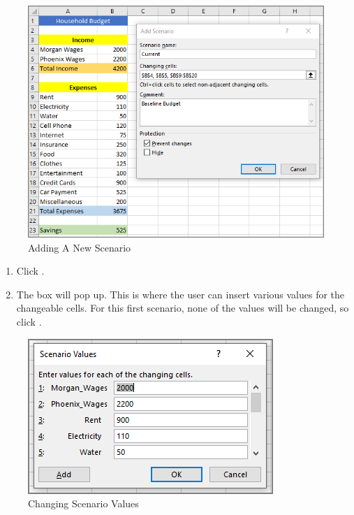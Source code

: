 \begin{figure}[H]
	\centering
	\includegraphics[width=\maxwidth{.95\linewidth}]{gfx/ch08_fig24}
	\caption{Adding A New Scenario}
	\label{08:fig24}
\end{figure}

\begin{enumerate}[resume]

	\item Click .
	\item The  box will pop up. This is where the user can insert various values for the changeable cells. For this first scenario, none of the values will be changed, so click .
	
\end{enumerate}

\begin{figure}[H]
	\centering
	\includegraphics[width=\maxwidth{.95\linewidth}]{gfx/ch08_fig25}
	\caption{Changing Scenario Values}
	\label{08:fig25}
\end{figure}

